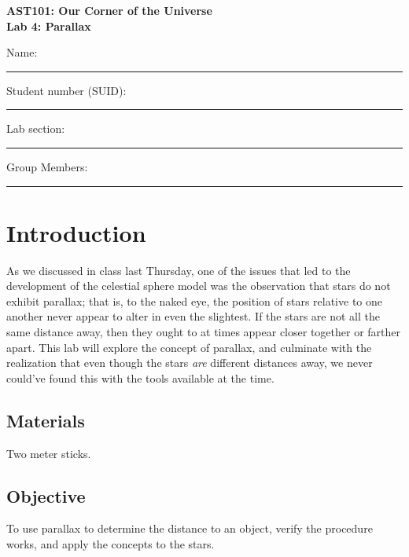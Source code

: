 \documentclass[11pt]{article}
\begin{document}
\begin{center}
\textbf{\Large
AST101: Our Corner of the Universe \\
\vspace*{0.1cm}
Lab 4: Parallax
}
\end{center}

\vspace*{0.5cm}

{\Large Name:}\vspace*{0.5cm}\\\hrule
{\Large Student number (SUID):}\vspace*{0.5cm}\\\hrule
{\Large Lab section:}\vspace*{0.5cm}\\\hrule
{\Large Group Members:}\vspace*{0.5cm}\\\hrule
\vspace*{0.5cm}

\section{Introduction}

As we discussed in class last Thursday, one of the issues that led to the development of the celestial sphere model was the observation that stars do not exhibit parallax; that is, to the naked eye, the position of stars relative to one another never appear to alter in even the slightest. If the stars are not all the same distance away, then they ought to at times appear closer together or farther apart. This lab will explore the concept of parallax, and culminate with the realization that even though the stars {\it are} different distances away, we never could've found this with the tools available at the time. 

\subsection*{Materials}

Two meter sticks.

\subsection*{Objective}

To use parallax to determine the distance to an object, verify the procedure works, and apply the concepts to the stars.
\end{document}
